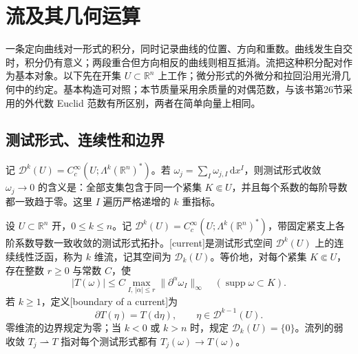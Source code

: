 
% 
% 

\section{流及其几何运算}
\label{g3:sec:2201}

一条定向曲线对一形式的积分，同时记录曲线的位置、方向和重数。曲线发生自交时，积分仍有意义；两段重合但方向相反的曲线则相互抵消。流把这种积分配对作为基本对象。以下先在开集 \(U\subset\mathbb R^n\) 上工作；微分形式的外微分和拉回沿用光滑几何中的约定。基本构造可对照\cite[第25--26节，第129--144页]{Simon1983}；本节质量采用余质量的对偶范数，与该书第26节采用的外代数 Euclid 范数有所区别，两者在简单向量上相同。

\subsection{测试形式、连续性和边界}
\label{g3:subsec:2201:01}
记 \(\mathcal D^k(U)=C_c^\infty(U;\Lambda^k(\mathbb R^n)^*)\)。若
\(\omega_j=\sum_I\omega_{j,I}\,\mathrm dx^I\)，则测试形式收敛 \(\omega_j\to0\) 的含义是：全部支集包含于同一个紧集 \(K\Subset U\)，并且每个系数的每阶导数都一致趋于零。这里 \(I\) 遍历严格递增的 \(k\) 重指标。

\begin{definition}\label{g3:def:current}
	设 \(U\subset\mathbb R^n\) 开，\(0\le k\le n\)。记 \(\mathcal D^k(U)=C_c^\infty(U;\Lambda^k(\mathbb R^n)^*)\)，带固定紧支上各阶系数导数一致收敛的测试形式拓扑。[current]是测试形式空间 \(\mathcal D^k(U)\) 上的连续线性泛函，称为 \(k\) 维流，记其空间为 \(\mathcal D_k(U)\)。等价地，对每个紧集 \(K\Subset U\)，存在整数 \(r\ge0\) 与常数 \(C\)，使
	\[
		|T(\omega)|\le C\max_{I,\,|\alpha|\le r}\|\partial^\alpha\omega_I\|_\infty
		\quad(\operatorname{supp}\omega\subset K).
	\]
	若 \(k\ge1\)，定义[boundary of a current]为
	\[
		\partial T(\eta)=T(\mathrm d\eta),\qquad \eta\in\mathcal D^{k-1}(U).
	\]
	零维流的边界规定为零；当 \(k<0\) 或 \(k>n\) 时，规定 \(\mathcal D_k(U)=\{0\}\)。流列的弱收敛 \(T_j\rightharpoonup T\) 指对每个测试形式都有 \(T_j(\omega)\to T(\omega)\)。
\end{definition}

